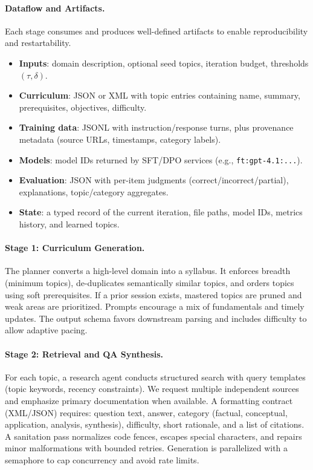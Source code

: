 \documentclass[11pt]{article}
\begin{document}
\paragraph{Dataflow and Artifacts.} Each stage consumes and produces well-defined artifacts to enable reproducibility and restartability.
\begin{itemize}
  \item \textbf{Inputs}: domain description, optional seed topics, iteration budget, thresholds $(\tau,\delta)$.
  \item \textbf{Curriculum}: JSON or XML with topic entries containing name, summary, prerequisites, objectives, difficulty.
  \item \textbf{Training data}: JSONL with instruction/response turns, plus provenance metadata (source URLs, timestamps, category labels).
  \item \textbf{Models}: model IDs returned by SFT/DPO services (e.g., \texttt{ft:gpt-4.1:...}).
  \item \textbf{Evaluation}: JSON with per-item judgments (correct/incorrect/partial), explanations, topic/category aggregates.
  \item \textbf{State}: a typed record of the current iteration, file paths, model IDs, metrics history, and learned topics.
\end{itemize}

\paragraph{Stage 1: Curriculum Generation.} The planner converts a high-level domain into a syllabus. It enforces breadth (minimum topics), de-duplicates semantically similar topics, and orders topics using soft prerequisites. If a prior session exists, mastered topics are pruned and weak areas are prioritized. Prompts encourage a mix of fundamentals and timely updates. The output schema favors downstream parsing and includes difficulty to allow adaptive pacing.

\paragraph{Stage 2: Retrieval and QA Synthesis.} For each topic, a research agent conducts structured search with query templates (topic keywords, recency constraints). We request multiple independent sources and emphasize primary documentation when available. A formatting contract (XML/JSON) requires: question text, answer, category (factual, conceptual, application, analysis, synthesis), difficulty, short rationale, and a list of citations. A sanitation pass normalizes code fences, escapes special characters, and repairs minor malformations with bounded retries. Generation is parallelized with a semaphore to cap concurrency and avoid rate limits.
\end{document}
